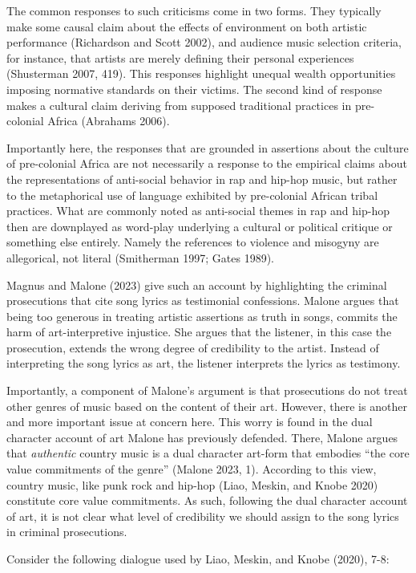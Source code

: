 \documentclass[
  letterpaper,
  DIV=11,
  numbers=noendperiod]{scrreprt}
\begin{document}
\begin{tcolorbox}[enhanced jigsaw, arc=.35mm, breakable, rightrule=.15mm, colback=white, colframe=quarto-callout-important-color-frame, bottomrule=.15mm, leftrule=.75mm, opacityback=0, toprule=.15mm, left=2mm]
\begin{tcolorbox}[enhanced jigsaw, arc=.35mm, breakable, rightrule=.15mm, colback=white, colframe=quarto-callout-tip-color-frame, bottomrule=.15mm, leftrule=.75mm, opacityback=0, toprule=.15mm, left=2mm]
The common responses to such criticisms come in two forms. They
typically make some causal claim about the effects of environment on
both artistic performance (Richardson and Scott 2002), and audience
music selection criteria, for instance, that artists are merely defining
their personal experiences (Shusterman 2007, 419). This responses
highlight unequal wealth opportunities imposing normative standards on
their victims. The second kind of response makes a cultural claim
deriving from supposed traditional practices in pre-colonial Africa
(Abrahams 2006).

Importantly here, the responses that are grounded in assertions about
the culture of pre-colonial Africa are not necessarily a response to the
empirical claims about the representations of anti-social behavior in
rap and hip-hop music, but rather to the metaphorical use of language
exhibited by pre-colonial African tribal practices. What are commonly
noted as anti-social themes in rap and hip-hop then are downplayed as
word-play underlying a cultural or political critique or something else
entirely. Namely the references to violence and misogyny are
allegorical, not literal (Smitherman 1997; Gates 1989).

Magnus and Malone (2023) give such an account by highlighting the
criminal prosecutions that cite song lyrics as testimonial confessions.
Malone argues that being too generous in treating artistic assertions as
truth in songs, commits the harm of art-interpretive injustice. She
argues that the listener, in this case the prosecution, extends the
wrong degree of credibility to the artist. Instead of interpreting the
song lyrics as art, the listener interprets the lyrics as testimony.

Importantly, a component of Malone's argument is that prosecutions do
not treat other genres of music based on the content of their art.
However, there is another and more important issue at concern here. This
worry is found in the dual character account of art Malone has
previously defended. There, Malone argues that \emph{authentic} country
music is a dual character art-form that embodies ``the core value
commitments of the genre'' (Malone 2023, 1). According to this view,
country music, like punk rock and hip-hop (Liao, Meskin, and Knobe 2020)
constitute core value commitments. As such, following the dual character
account of art, it is not clear what level of credibility we should
assign to the song lyrics in criminal prosecutions.

Consider the following dialogue used by Liao, Meskin, and Knobe (2020),
7-8:


\end{tcolorbox}
\end{tcolorbox}
\end{document}
